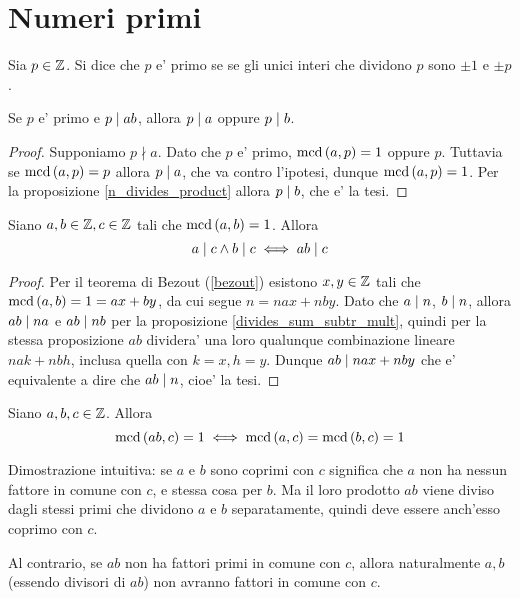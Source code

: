 \section{Numeri primi}

\begin{definition}
    Sia $p \in \mathbb{Z}$. Si dice che $p$ e' primo se se gli unici interi che dividono $p$ sono
    $\pm 1$ e $\pm p$.
\end{definition}

\begin{proposition}\label{primo_divide_prodotto}
    Se $p$ e' primo e $p \mid ab$, allora $p \mid a$ oppure $p \mid b$.
\end{proposition}
\begin{proof}
    Supponiamo $p \nmid a$. Dato che $p$ e' primo, $\operatorname{mcd}\left(a, p\right) = 1$ oppure $p$.
    Tuttavia se $\operatorname{mcd}\left(a, p\right) = p$ allora $p \mid a$, che va contro l'ipotesi, dunque 
    $\operatorname{mcd}\left(a, p\right) = 1$. Per la proposizione \ref{n_divides_product} allora $p \mid b$, che e' la tesi.
\end{proof}

\begin{proposition} \label{prodotto_numeri_coprimi}
    Siano $a, b \in \mathbb{Z}, c \in \mathbb{Z}$ tali che $\operatorname{mcd}\left(a, b\right) = 1$. Allora
    \begin{equation}
        a \mid c \land b \mid c \iff ab \mid c
    \end{equation}
\end{proposition}
\begin{proof}
    Per il teorema di Bezout (\ref{bezout}) esistono $x, y \in \mathbb{Z}$ tali che $\operatorname{mcd}\left(a, b\right) = 1 = ax+by$, da cui segue $n = nax + nby$. 
    Dato che $a \mid n$, $b \mid n$, allora $ab \mid na$ e $ab \mid nb$ per la proposizione \ref{divides_sum_subtr_mult}, quindi per la stessa proposizione $ab$ dividera' una loro qualunque combinazione lineare $nak + nbh$, inclusa quella con $k = x, h = y$.
    Dunque $ab \mid nax + nby$ che e' equivalente a dire che $ab \mid n$, cioe' la tesi.
\end{proof}


\begin{proposition} \label{prodotto_coprimo_2}
    Siano $a, b, c \in \mathbb{Z}$. Allora
    \begin{equation}
        \operatorname{mcd}\left(ab, c\right) = 1 \iff \operatorname{mcd}\left(a, c\right) = \operatorname{mcd}\left(b, c\right) = 1
    \end{equation}
\end{proposition}
\begin{intuition}
    Dimostrazione intuitiva: se $a$ e $b$ sono coprimi con $c$ significa che $a$ non ha nessun fattore in comune con $c$, e stessa cosa per $b$. Ma il loro prodotto $ab$ viene diviso dagli stessi primi che dividono $a$ e $b$ separatamente, quindi deve essere anch'esso coprimo con $c$.

    Al contrario, se $ab$ non ha fattori primi in comune con $c$, allora naturalmente $a, b$ (essendo divisori di $ab$) non avranno fattori in comune con $c$.
\end{intuition}

